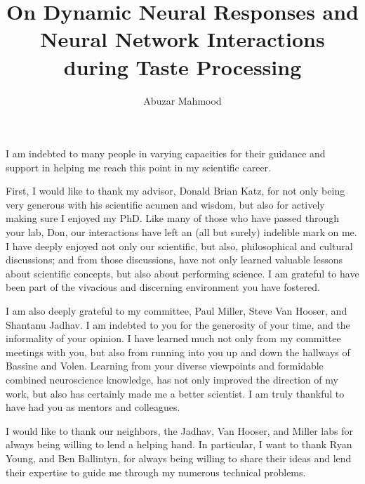 \documentclass{brandeis-dissertation3.12}
\title{On Dynamic Neural Responses and Neural Network Interactions during Taste Processing}
\author{Abuzar Mahmood}
\begin{document}
\maketitlepage
\makeapproval
\makecopyright

\begin{dissertation-acknowledgements}
I am indebted to many people in varying capacities for their guidance and support in helping me reach this point in my scientific career.

First, I would like to thank my advisor, Donald Brian Katz, for not only being very generous with his scientific acumen and wisdom, but also for actively making sure I enjoyed my PhD. Like many of those who have passed through your lab, Don, our interactions have left an (all but surely) indelible mark on me. I have deeply enjoyed not only our scientific, but also, philosophical and cultural discussions; and from those discussions, have not only learned valuable lessons about scientific concepts, but also about performing science. I am grateful to have been part of the vivacious and discerning environment you have fostered. 

I am also deeply grateful to my committee, Paul Miller, Steve Van Hooser, and Shantanu Jadhav. I am indebted to you for the generosity of your time, and the informality of your opinion. I have learned much not only from my committee meetings with you, but also from running into you up and down the hallways of Bassine and Volen. Learning from your diverse viewpoints and formidable combined neuroscience knowledge, has not only improved the direction of my work, but also has certainly made me a better scientist. I am truly thankful to have had you as mentors and colleagues.

I would like to thank our neighbors, the Jadhav, Van Hooser, and Miller labs for always being willing to lend a helping hand. In particular, I want to thank Ryan Young, and Ben Ballintyn, for always being willing to share their ideas and lend their expertise to guide me through my numerous technical problems.


\end{dissertation-acknowledgements}
\end{document}
